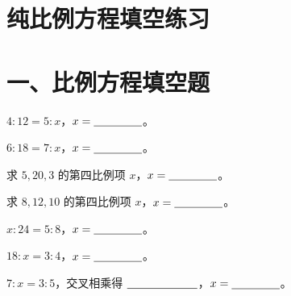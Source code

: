 \documentclass{exam-zh}
\begin{document}
\section*{纯比例方程填空练习}

\section*{一、比例方程填空题}


\begin{problem}[points=4]
    $4:12=5:x$，$x=\underline{\hspace{1.5cm}}$。
\end{problem}



\begin{problem}[points=4]
    $6:18=7:x$，$x=\underline{\hspace{1.5cm}}$。
\end{problem}



\begin{problem}[points=4]
    求 $5,20,3$ 的第四比例项 $x$，$x=\underline{\hspace{1.5cm}}$。
\end{problem}



\begin{problem}[points=4]
    求 $8,12,10$ 的第四比例项 $x$，$x=\underline{\hspace{1.5cm}}$。
\end{problem}



\begin{problem}[points=4]
    $x:24=5:8$，$x=\underline{\hspace{1.5cm}}$。
\end{problem}



\begin{problem}[points=4]
    $18:x=3:4$，$x=\underline{\hspace{1.5cm}}$。
\end{problem}



\begin{problem}[points=4]
    $7:x=3:5$，交叉相乘得 $\underline{\hspace{2.2cm}}$，$x=\underline{\hspace{1.5cm}}$。
\end{problem}
\end{document}
